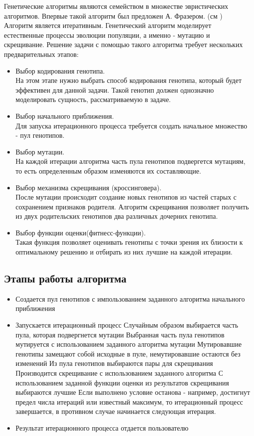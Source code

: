 Генетические алгоритмы являются семейством в множестве эвристических алгоритмов. Впервые такой алгоритм был предложен А. Фразером. (см \cite{Фразер1970})
Алгоритм является итеративным.
Генетический алгоритм моделирует естественные процессы эволюции популяции, а именно - мутацию и скрещивание.
Решение задачи с помощью такого алгоритма требует нескольких предварительных этапов:
\begin{itemize}
	\item Выбор кодирования генотипа.\\
На этом этапе нужно выбрать способ кодирования генотипа, который будет эффективен для данной задачи. Такой генотип должен однозначно моделировать сущность, рассматриваемую в задаче.
	\item Выбор начального приближения.\\
Для запуска итерационного процесса требуется создать начальное множество - пул генотипов.
	\item Выбор мутации.\\
На каждой итерации алгоритма часть пула генотипов подвергется мутациям, то есть определенным образом изменяются их составляющие.
	\item Выбор механизма скрещивания (кроссинговера).\\
После мутации происходит создание новых генотипов из частей старых с сохранением признаков родителя. Алгоритм скрещивания позволяет получить из двух родительских генотипов два различных дочерних генотипа.
	\item Выбор функции оценки(фитнесс-функции).\\
Такая функция позволяет оценивать генотипы с точки зрения их близости к оптимальному решению и отбирать из них лучшие на каждой итерации.
\end{itemize}

\subsection{Этапы работы алгоритма}%
\begin{itemize}%
\item Создается пул генотипов с импользованием заданного алгоритма начального приближения
\item Запускается итерационный процесс
	\subitem Случайным образом выбирается часть пула, которая подвергнется мутации
	\subitem Выбранная часть пула генотипов мутируется с использованием заданного алгоритма мутации
	\subitem Мутировавшие генотипы замещают собой исходные в пуле, немутировавшие остаются без изменений
	\subitem Из пула генотипов выбираются пары для скрещивания
	\subitem Производится скрещивание с использованием заданного алгоритма
	\subitem С использованием заданной функции оценки из результатов скрещивания выбираются лучшие 
	\subitem Если выполнено условие останова - например, достигнут предел числа итераций или известный максимум, то итерационный процесс завершается, в противном случае  начинается следующая итерация.
\item Результат итерационного процесса отдается пользователю
\end{itemize}

